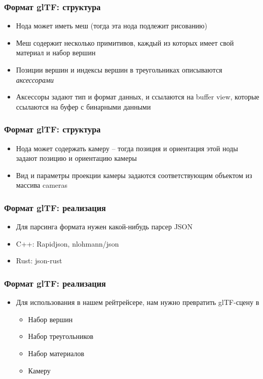 \documentclass[10pt]{beamer}
\begin{document}
\begin{frame}
\frametitle{Формат glTF: структура}
\begin{itemize}
\item Нода может иметь меш (тогда эта нода подлежит рисованию)
\pause
\item Меш содержит несколько примитивов, каждый из которых имеет свой материал и набор вершин
\pause
\item Позиции вершин и индексы вершин в треугольниках описываются \textit{аксессорами}
\pause
\item Аксессоры задают тип и формат данных, и ссылаются на buffer view, которые ссылаются на буфер с бинарными данными
\end{itemize}
\end{frame}

\begin{frame}
\frametitle{Формат glTF: структура}
\begin{itemize}
\item Нода может содержать камеру -- тогда позиция и ориентация этой ноды задают позицию и ориентацию камеры
\pause
\item Вид и параметры проекции камеры задаются соответствующим объектом из массива cameras
\end{itemize}
\end{frame}

\begin{frame}
\frametitle{Формат glTF: реализация}
\begin{itemize}
\item Для парсинга формата нужен какой-нибудь парсер JSON
\pause
\item C++: Rapidjson, nlohmann/json
\pause
\item Rust: json-rust
\end{itemize}
\end{frame}

\begin{frame}
\frametitle{Формат glTF: реализация}
\begin{itemize}
\item Для использования в нашем рейтрейсере, нам нужно превратить glTF-сцену в
\pause
\begin{itemize}
\item Набор вершин
\pause
\item Набор треугольников
\pause
\item Набор материалов
\pause
\item Камеру
\end{itemize}
\end{itemize}
\end{frame}
\end{document}
